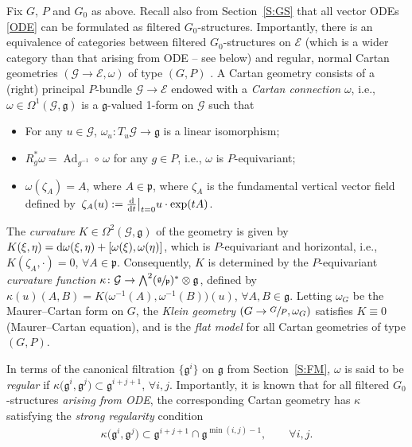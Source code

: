 \documentclass[10pt,a4paper]{amsart}
\newcommand\tensor{\otimes}
\newcommand{\g}{\mathfrak{g}}
\newcommand\cG{\mathcal{G}}
\newcommand\Ad{\operatorname{Ad}}
\newcommand\fg{\mathfrak{g}}
\newcommand\fp{\mathfrak{p}}
\newcommand\cE{\mathcal{E}}
\numberwithin{equation}{section}
\begin{document}
Fix $G$, $P$ and $G_0$ as above. Recall also from Section~\ref{S:GS} that all vector ODEs \eqref{ODE} can be formulated as filtered $G_0$-structures. Importantly, there is an equivalence of categories between filtered $G_0$-structures on $\cE$ (which is a wider category than that arising from ODE -- see below) and regular, normal Cartan geometries $(\cG \to \cE, \omega)$ of type $(G,P)$ \cite{CDT2020, DKM1999}. A Cartan geometry consists of a (right) principal $P$-bundle $\cG \to \cE$ endowed with a {\em Cartan connection} $\omega$, i.e., $\omega \in \Omega^1(\cG,\g)$ is a $\g$-valued 1-form on $\cG$ such that
\begin{itemize}\itemsep=0pt
\item[(a)] For any $u \in \cG$, $\omega_u\colon T_u \cG \to \fg$ is a linear isomorphism;
\item[(b)] $R_g^{\ast}\omega = \Ad_{g^{-1}} \circ\, \omega$ for any $g \in P$, i.e., $\omega$ is $P$-equivariant;
\item[(c)] $\omega(\zeta_A) = A$, where $A \in \mathfrak{p}$, where $\zeta_A$ is the fundamental vertical vector field defined by~$\zeta_A(u) := \frac{{\rm d}}{{\rm d}t}{\big|}_{t=0} u\cdot\exp(tA)$.
\end{itemize}

The {\em curvature} $K \in \Omega^2(\cG,\g)$ of the geometry is given by $K(\xi, \eta) = {\rm d}\omega(\xi, \eta) + [\omega(\xi),\omega(\eta)]$, which is $P$-equivariant and horizontal, i.e., $K(\zeta_A,\cdot) = 0$, $\forall A \in \fp$. Consequently, $K$ is determined by the $P$-equivariant {\em curvature function} $\kappa\colon \cG \to \bigwedge^2(\sfrac{\g}{\fp})^{\ast}\tensor \g$, defined by
$\kappa (u)(A, B) = K\bigl(\omega^{-1}(A),\omega^{-1}(B)\bigr)(u)$, $\forall A,B \in \g$. Letting $\omega_G$ be the Maurer--Cartan form on $G$, the {\em Klein geometry} $(G \to \sfrac{G}{P}, \omega_G)$ satisfies $K \equiv 0$ (Maurer--Cartan equation), and is the {\em flat model} for all Cartan geometries of type $(G,P)$.

 In terms of the canonical filtration $\bigl\{ \g^i \bigr\}$ on $\g$ from Section~\ref{S:FM}, $\omega$ is said to be {\em regular} if $\kappa \bigl(\g^i, \g^j\bigr) \subset \g^{i+j+1}$, $\forall i,j$. Importantly, it is known that for all filtered $G_0$-structures {\em arising from ODE}, the corresponding Cartan geometry has $\kappa$ satisfying the {\em strong regularity} condition \cite[Remark~2.3]{CDT2020}
 \begin{align}\label{E:SR}
 \kappa \bigl(\g^i, \g^j\bigr) \subset \g^{i+j+1} \cap \g^{\min(i,j)-1},\qquad
\forall i,j.
 \end{align}
\end{document}
